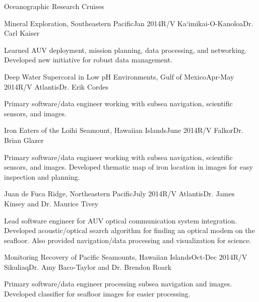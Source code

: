 \documentclass{resume} %
\begin{document}
\begin{rSection}{Oceanographic Research Cruises}

\begin{rSubsection}{Mineral Exploration, Southeastern Pacific}{Jan 2014}{R/V Ka`imikai-O-Kanoloa}{Dr. Carl Kaiser}
\item{Learned AUV deployment, mission planning, data processing, and networking. Developed new initiative for robust data management.}
\end{rSubsection}


\begin{rSubsection}{Deep Water Supercoral in Low pH Environments, Gulf of Mexico}{Apr-May 2014}{R/V Atlantis}{Dr. Erik Cordes}
\item{Primary software/data engineer working with subsea navigation, scientific sensors, and images.}
\end{rSubsection}

\begin{rSubsection}{Iron Eaters of the Loihi Seamount, Hawaiian Islands}{June 2014}{R/V Falkor}{Dr. Brian Glazer}
\item{Primary software/data engineer working with subsea navigation, scientific sensors, and images. Developed thematic map of iron location in images for easy inspection and planning. }
\end{rSubsection}


\begin{rSubsection}{Juan de Fuca Ridge, Northeastern Pacific}{July 2014}{R/V Atlantis}{Dr. James Kinsey and Dr. Maurice Tivey}
\item{Lead software engineer for AUV optical communication system integration. Developed acoustic/optical search algorithm for finding an optical modem on the seafloor. Also provided navigation/data processing and visualization for science.}
\end{rSubsection}


\begin{rSubsection}{Monitoring Recovery of Pacific Seamounts, Hawaiian Islands}{Oct-Dec 2014}{R/V Sikuliaq}{Dr. Amy Baco-Taylor and Dr. Brendon Roark}
\item{Primary software/data engineer processing subsea navigation and images. Developed classifier for seafloor images for easier processing.}
\end{rSubsection}



\end{rSection}
\end{document}
